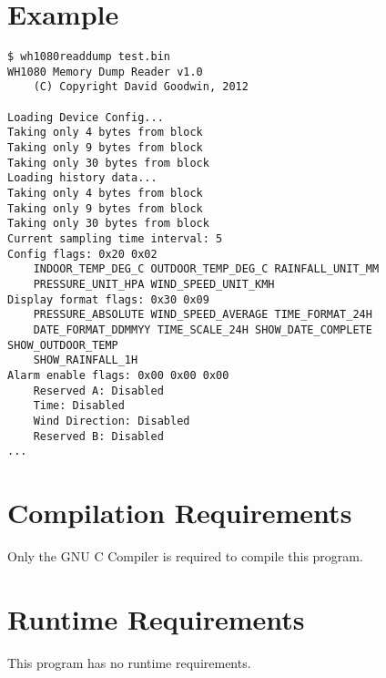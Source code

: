 \documentclass[a4paper,10pt,draft]{book}
\newcommand{\partnumber}{\ifthenelse{\isundefined{\projectnum}}{}{\projectnum-\docnum	\ifthenelse{\equal{\docrev}{001}}{}{.\docrev}}}
\begin{document}
\section{Example}
\begin{verbatim}
$ wh1080readdump test.bin
WH1080 Memory Dump Reader v1.0
	(C) Copyright David Goodwin, 2012

Loading Device Config...
Taking only 4 bytes from block
Taking only 9 bytes from block
Taking only 30 bytes from block
Loading history data...
Taking only 4 bytes from block
Taking only 9 bytes from block
Taking only 30 bytes from block
Current sampling time interval: 5
Config flags: 0x20 0x02
	INDOOR_TEMP_DEG_C OUTDOOR_TEMP_DEG_C RAINFALL_UNIT_MM 
	PRESSURE_UNIT_HPA WIND_SPEED_UNIT_KMH 
Display format flags: 0x30 0x09
	PRESSURE_ABSOLUTE WIND_SPEED_AVERAGE TIME_FORMAT_24H 
	DATE_FORMAT_DDMMYY TIME_SCALE_24H SHOW_DATE_COMPLETE SHOW_OUTDOOR_TEMP 
	SHOW_RAINFALL_1H 
Alarm enable flags: 0x00 0x00 0x00
	Reserved A: Disabled
	Time: Disabled
	Wind Direction: Disabled
	Reserved B: Disabled
...
\end{verbatim}

\section{Compilation Requirements}
Only the GNU C Compiler is required to compile this program.

\section{Runtime Requirements}
This program has no runtime requirements.


\newpage
\thispagestyle{empty}
\begin{flushright}
\null
\vfill
\tt \partnumber
\end{flushright}
\end{document}
